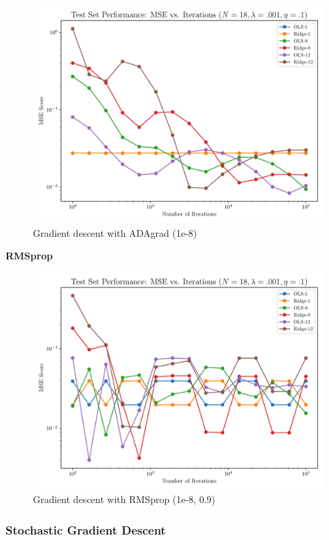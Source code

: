 \documentclass[amssymb,twocolumn,aps]{revtex4}
\begin{document}
\begin{figure}[h]
    \centering
    \includegraphics[width=.95 \linewidth]{Figures/OLS_Ridge_ADAgrad.pdf}
    \caption{Gradient descent with ADAgrad (1e-8)}
    \label{fig:GradADAgrad}
\end{figure}


\textbf{RMSprop}



\begin{figure}[h]
    \centering
    \includegraphics[width=.95 \linewidth]{Figures/OLS_Ridge_RMSprop.pdf}
    \caption{Gradient descent with RMSprop (1e-8, 0.9)}
    \label{fig:GradRMSprop}
\end{figure}


\subsubsection{Stochastic Gradient Descent}
\end{document}

